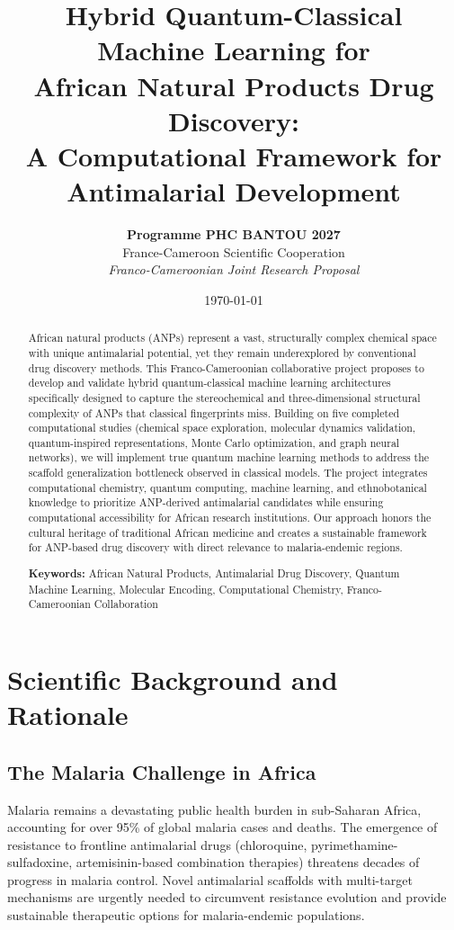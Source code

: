 \documentclass[11pt,a4paper]{article}
\title{\textbf{Hybrid Quantum-Classical Machine Learning for\\
African Natural Products Drug Discovery:\\
A Computational Framework for Antimalarial Development}}
\author{
    \textbf{Programme PHC BANTOU 2027}\\[0.5em]
    \normalsize France-Cameroon Scientific Cooperation\\[1em]
    \normalsize \textit{Franco-Cameroonian Joint Research Proposal}
}
\date{\today}
\begin{document}
\maketitle

\begin{abstract}
\noindent
African natural products (ANPs) represent a vast, structurally complex chemical space with unique antimalarial potential, yet they remain underexplored by conventional drug discovery methods. This Franco-Cameroonian collaborative project proposes to develop and validate hybrid quantum-classical machine learning architectures specifically designed to capture the stereochemical and three-dimensional structural complexity of ANPs that classical fingerprints miss. Building on five completed computational studies (chemical space exploration, molecular dynamics validation, quantum-inspired representations, Monte Carlo optimization, and graph neural networks), we will implement true quantum machine learning methods to address the scaffold generalization bottleneck observed in classical models. The project integrates computational chemistry, quantum computing, machine learning, and ethnobotanical knowledge to prioritize ANP-derived antimalarial candidates while ensuring computational accessibility for African research institutions. Our approach honors the cultural heritage of traditional African medicine and creates a sustainable framework for ANP-based drug discovery with direct relevance to malaria-endemic regions.

\vspace{0.5em}
\noindent\textbf{Keywords:} African Natural Products, Antimalarial Drug Discovery, Quantum Machine Learning, Molecular Encoding, Computational Chemistry, Franco-Cameroonian Collaboration
\end{abstract}

\clearpage
\tableofcontents
\clearpage

\section{Scientific Background and Rationale}

\subsection{The Malaria Challenge in Africa}

Malaria remains a devastating public health burden in sub-Saharan Africa, accounting for over 95\% of global malaria cases and deaths. The emergence of resistance to frontline antimalarial drugs (chloroquine, pyrimethamine-sulfadoxine, artemisinin-based combination therapies) threatens decades of progress in malaria control. Novel antimalarial scaffolds with multi-target mechanisms are urgently needed to circumvent resistance evolution and provide sustainable therapeutic options for malaria-endemic populations.
\end{document}
